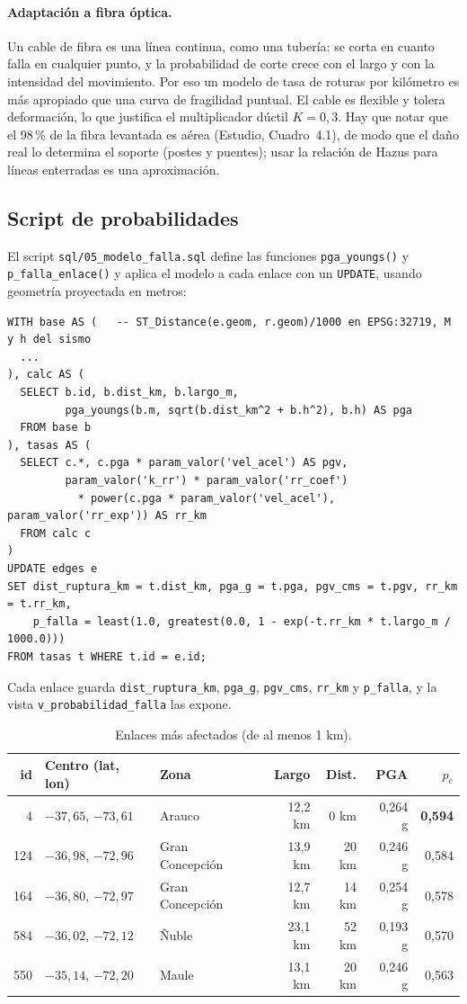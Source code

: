 \documentclass[11pt,a4paper]{article}
\newcommand{\cod}[1]{\texttt{#1}}
\begin{document}
\paragraph{Adaptación a fibra óptica.} Un cable de fibra es una línea continua, como una tubería: se
corta en cuanto falla en cualquier punto, y la probabilidad de corte crece con el largo y con la
intensidad del movimiento. Por eso un modelo de tasa de roturas por kilómetro es más apropiado que una
curva de fragilidad puntual. El cable es flexible y tolera deformación, lo que justifica el
multiplicador dúctil $K = 0{,}3$. Hay que notar que el 98\,\% de la fibra levantada es aérea (Estudio,
Cuadro~4.1), de modo que el daño real lo determina el soporte (postes y puentes); usar la relación de
Hazus para líneas enterradas es una aproximación.

\subsection{Script de probabilidades}
El script \cod{sql/05\_modelo\_falla.sql} define las funciones \cod{pga\_youngs()} y
\cod{p\_falla\_enlace()} y aplica el modelo a cada enlace con un \cod{UPDATE}, usando geometría
proyectada en metros:

\begin{Verbatim}
WITH base AS (   -- ST_Distance(e.geom, r.geom)/1000 en EPSG:32719, M y h del sismo
  ...
), calc AS (
  SELECT b.id, b.dist_km, b.largo_m,
         pga_youngs(b.m, sqrt(b.dist_km^2 + b.h^2), b.h) AS pga
  FROM base b
), tasas AS (
  SELECT c.*, c.pga * param_valor('vel_acel') AS pgv,
         param_valor('k_rr') * param_valor('rr_coef')
           * power(c.pga * param_valor('vel_acel'), param_valor('rr_exp')) AS rr_km
  FROM calc c
)
UPDATE edges e
SET dist_ruptura_km = t.dist_km, pga_g = t.pga, pgv_cms = t.pgv, rr_km = t.rr_km,
    p_falla = least(1.0, greatest(0.0, 1 - exp(-t.rr_km * t.largo_m / 1000.0)))
FROM tasas t WHERE t.id = e.id;
\end{Verbatim}

Cada enlace guarda \cod{dist\_ruptura\_km}, \cod{pga\_g}, \cod{pgv\_cms}, \cod{rr\_km} y
\cod{p\_falla}, y la vista \cod{v\_probabilidad\_falla} las expone.

\begin{table}[h]
\centering
\begin{tabular}{rllrrrr}
\toprule
id & Centro (lat, lon) & Zona & Largo & Dist. & PGA & $p_e$ \\
\midrule
4 & $-37{,}65$, $-73{,}61$ & Arauco & 12,2 km & 0 km & 0,264 g & \textbf{0,594} \\
124 & $-36{,}98$, $-72{,}96$ & Gran Concepción & 13,9 km & 20 km & 0,246 g & 0,584 \\
164 & $-36{,}80$, $-72{,}97$ & Gran Concepción & 12,7 km & 14 km & 0,254 g & 0,578 \\
584 & $-36{,}02$, $-72{,}12$ & Ñuble & 23,1 km & 52 km & 0,193 g & 0,570 \\
550 & $-35{,}14$, $-72{,}20$ & Maule & 13,1 km & 20 km & 0,246 g & 0,563 \\
\bottomrule
\end{tabular}
\caption{Enlaces más afectados (de al menos 1 km).}
\end{table}
\end{document}
